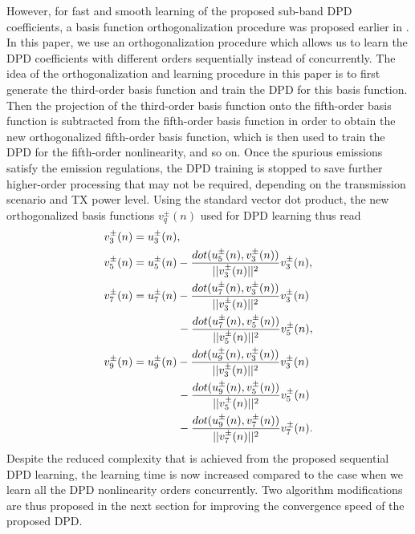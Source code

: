 \documentclass[9pt,conference]{IEEEtran}
\begin{document}
\begin{spacing}{0.88}
However, for fast and smooth learning of the proposed sub-band DPD coefficients, a basis function orthogonalization procedure was proposed earlier in \cite{TMTT_SubbandDPD}. In this paper, we use an orthogonalization procedure which allows us to learn the DPD coefficients with different orders sequentially instead of concurrently. The idea of the orthogonalization and learning procedure in this paper is to first generate the third-order basis function and train the DPD for this basis function. Then the projection of the third-order basis function onto the fifth-order basis function is subtracted from the fifth-order basis function in order to obtain the new orthogonalized fifth-order basis function, which is then used to train the DPD for the fifth-order nonlinearity, and so on. Once the spurious emissions satisfy the emission regulations, the DPD training is stopped to save further higher-order processing that may not be required, depending on the transmission scenario and TX power level. Using the standard vector dot product, the new orthogonalized basis functions $v^\pm_q(n)$ used for DPD learning thus read
\begin{align}
\small
v^\pm_3(n) &= u^\pm_3(n), \label{eq:IM3_OrthBasis_1} \\
v^\pm_5(n) &= u^\pm_5(n) - \frac{dot(u^\pm_5(n),v^\pm_3(n))}{||v^\pm_3(n)||^2} v^\pm_3(n), \label{eq:IM3_OrthBasis_2} \\
v^\pm_7(n) &= u^\pm_7(n)   - \frac{dot(u^\pm_7(n),v^\pm_3(n))}{||v^\pm_3(n)||^2} v^\pm_3(n) \nonumber\\
&\:\:\:\:\:\:\:\:\:\:\:\:\:\:\:\:\:\: - \frac{dot(u^\pm_7(n),v^\pm_5(n))}{||v^\pm_5(n)||^2} v^\pm_5(n), \label{eq:IM3_OrthBasis_3}\\
v^\pm_9(n) &= u^\pm_9(n) - \frac{dot(u^\pm_9(n),v^\pm_3(n))}{||v^\pm_3(n)||^2} v^\pm_3(n) \nonumber\\
&\:\:\:\:\:\:\:\:\:\:\:\:\:\:\:\:\:\: - \frac{dot(u^\pm_9(n),v^\pm_5(n))}{||v^\pm_5(n)||^2} v^\pm_5(n) \nonumber\\ 
&\:\:\:\:\:\:\:\:\:\:\:\:\:\:\:\:\:\:	- \frac{dot(u^\pm_9(n),v^\pm_7(n))}{||v^\pm_7(n)||^2} v^\pm_7(n). \label{eq:IM3_OrthBasis_4}
\end{align}
\normalsize
Despite the reduced complexity that is achieved from the proposed sequential DPD learning, the learning time is now increased compared to the case when we learn all the DPD nonlinearity orders concurrently. Two algorithm modifications are thus proposed in the next section for improving the convergence speed of the proposed DPD.


\end{spacing}
\end{document}

